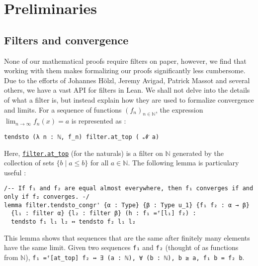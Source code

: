 \documentclass[a4paper,UKenglish,cleveref, autoref, thm-restate]{lipics-v2021}
\newcommand{\lean}[1]{\texttt{#1}\xspace} %
\begin{document}
\section{Preliminaries}
\label{section2}
\subsection{Filters and convergence}
None of our mathematical proofs require filters on paper, however, we find that working with them makes 
formalizing our proofs significantly less cumbersome. Due to the efforts of 
Johannes Hölzl, Jeremy Avigad, Patrick Massot and several others, we have a vast API for filters in Lean. 
We shall not delve into the details of what a filter is, but instead explain how they are used to formalize convergence and limits. 
\newline For a sequence of functions $(f_n)_{n \in \mathbb{N}}$, the expression $\lim_{n \to \infty} f_n(x) = a$ is 
represented as :
\begin{lstlisting}
tendsto (λ n : ℕ, f_n) filter.at_top ( 𝓝 a)
\end{lstlisting}
Here, \href{https://leanprover-community.github.io/mathlib_docs/order/filter/at_top_bot.html#filter.at_top}{\lean{filter.at\_top}} 
(for the naturals) is a filter on $\mathbb{N}$ generated by the collection of sets $\{ b \mid a \leq b \}$ 
for all $a \in \mathbb{N}$. %
The following lemma is particulary useful :
\begin{lstlisting}
/-- If f₁ and f₂ are equal almost everywhere, then f₁ converges if and only if f₂ converges. -/
lemma filter.tendsto_congr' {α : Type} {β : Type u_1} {f₁ f₂ : α → β} 
  {l₁ : filter α} {l₂ : filter β} (h : f₁ =ᶠ[l₁] f₂) : 
  tendsto f₁ l₁ l₂ ↔ tendsto f₂ l₁ l₂
\end{lstlisting}
This lemma shows that sequences that are the same after finitely many 
elements have the same limit. 
Given two sequences \lean{f₁} and \lean{f₂} (thought of as functions from $\mathbb{N}$), \newline \lean{f₁ =ᶠ[at\_top] f₂ ↔ ∃ (a : ℕ), ∀ (b : ℕ), b ≥ a, f₁ b = f₂ b}. 
\end{document}
